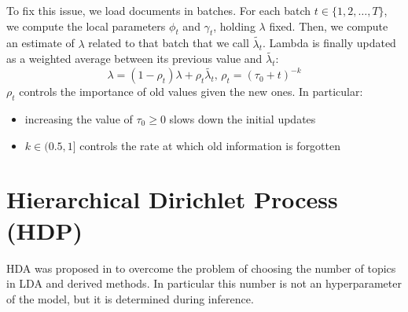To fix this issue, we load documents in batches. For each batch $t \in \{1,2,\dots,T\}$, we compute the local parameters $\phi_t$ and $\gamma_t$, holding $\lambda$ fixed.
Then, we compute an estimate of $\lambda$ related to that batch that we call $\tilde{\lambda_t}$.
Lambda is finally updated as a weighted average between its previous value and $\tilde{\lambda_t}$:
\begin{equation*}
    \lambda = (1 - \rho_t) \lambda + \rho_t \tilde{\lambda_t}, \, \rho_t = (\tau_0 + t)^{-k}
\end{equation*}
$\rho_t$ controls the importance of old values given the new ones. In particular:
\begin{itemize}
    \item increasing the value of $\tau_0 \geq 0$ slows down the initial updates
    \item $k \in (0.5, 1]$ controls the rate at which old information is forgotten
\end{itemize}

\section{Hierarchical Dirichlet Process (HDP)}
HDA was proposed in \cite{DBLP:journals/jmlr/WangPB11} to overcome the problem of choosing the number of topics in LDA and derived methods.
In particular this number is not an hyperparameter of the model, but it is determined during inference.
